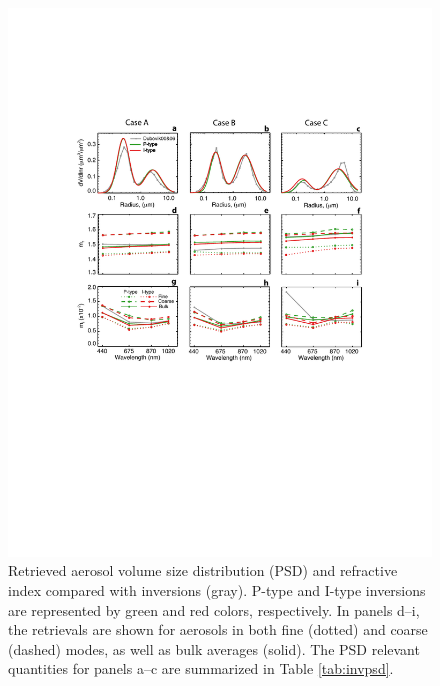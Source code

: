 \begin{figure}[t]
  \centering
  \includegraphics[width={\textwidth}]{figures/inv03.pdf}
  \caption{Retrieved aerosol volume size distribution (PSD) and refractive
index compared with \Dub inversions (gray). P-type and I-type
inversions are represented by green and red colors, respectively. In panels
d--i, the retrievals are shown for aerosols in both fine (dotted) and coarse
(dashed) modes, as well as bulk averages (solid). The PSD relevant quantities
for panels a--c are summarized in Table \ref{tab:invpsd}.}
  \label{fig:inv01}
\end{figure}

